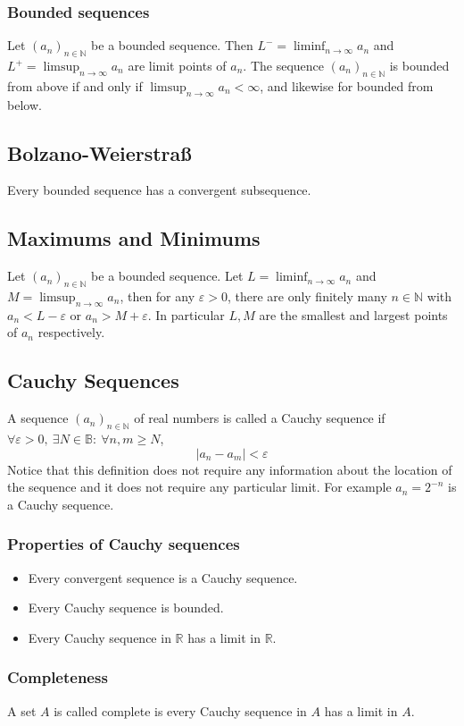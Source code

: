 \documentclass[12pt]{article}
\newcommand{\seq}[2]{(#1_#2)_{#2\in\mathbb{N}}}
\begin{document}
\subsubsection{Bounded sequences}
Let \(\seq{a}{n}\) be a bounded sequence. Then \(L^-=\liminf_{n\to\infty}a_n\) and \(L^+=\limsup_{n\to\infty}a_n\) are limit points of \(a_n\). The sequence \(\seq{a}{n}\) is bounded from above if and only if \(\limsup_{n\to\infty}a_n<\infty\), and likewise for bounded from below.
\subsection{Bolzano-Weierstra\ss}
Every bounded sequence has a convergent subsequence.
\subsection{Maximums and Minimums}
Let \(\seq{a}{n}\) be a bounded sequence. Let \(L=\liminf_{n\to\infty}a_n\) and \(M=\limsup_{n\to\infty}a_n\), then for any \(\varepsilon>0\), there are only finitely many \(n\in\mathbb{N}\) with \(a_n<L-\varepsilon\) or \(a_n>M+\varepsilon\). In particular \(L,M\) are the smallest and largest points of \(a_n\) respectively.
\subsection{Cauchy Sequences}
A sequence \(\seq{a}{n}\) of real numbers is called a Cauchy sequence if \(\forall \varepsilon>0,\ \exists N\in\mathbb{B}:\ \forall n,m\geq N\),
\[|a_n-a_m|<\varepsilon\]
Notice that this definition does not require any information about the location of the sequence and it does not require any particular limit. For example \(a_n=2^{-n}\) is a Cauchy sequence.
\subsubsection{Properties of Cauchy sequences}
\begin{itemize}
    \item Every convergent sequence is a Cauchy sequence.
    \item Every Cauchy sequence is bounded.
    \item Every Cauchy sequence in \(\mathbb{R}\) has a limit in \(\mathbb{R}\).
\end{itemize}
\subsubsection{Completeness}
A set \(A\) is called complete is every Cauchy sequence in \(A\) has a limit in \(A\).
\end{document}
